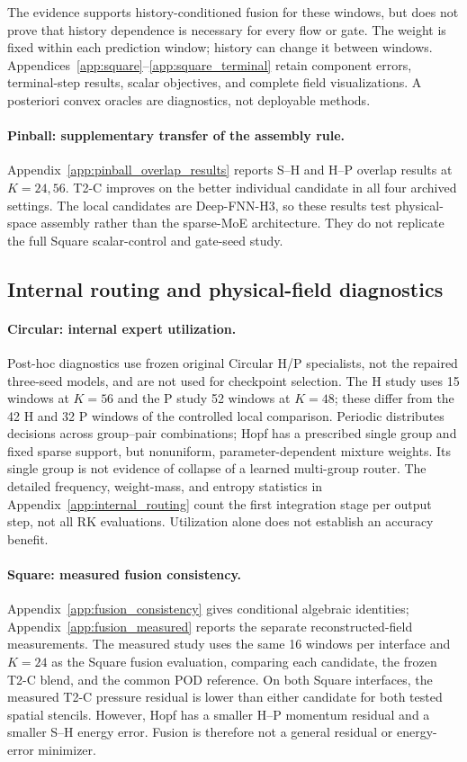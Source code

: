 The evidence supports history-conditioned fusion for these windows,
but does not prove that history dependence is necessary for every
flow or gate. The weight is fixed within each prediction window;
history can change it between windows.
Appendices~\ref{app:square}--\ref{app:square_terminal} retain component errors, terminal-step
results, scalar objectives, and complete field visualizations.
A posteriori convex oracles are diagnostics, not deployable methods.

\paragraph{Pinball: supplementary transfer of the assembly rule.}
Appendix~\ref{app:pinball_overlap_results} reports S--H and H--P
overlap results at $K=24,56$. T2-C improves on the better individual
candidate in all four archived settings. The local candidates are
Deep-FNN-H3, so these results test physical-space assembly rather than
the sparse-MoE architecture. They do not replicate the full Square
scalar-control and gate-seed study.

\subsection{Internal routing and physical-field diagnostics}
\label{sec:exp_diagnostics}

\paragraph{Circular: internal expert utilization.}
Post-hoc diagnostics use frozen original Circular H/P specialists,
not the repaired three-seed models, and are not used for checkpoint
selection. The H study uses 15 windows at $K=56$ and the P study
52 windows at $K=48$; these differ from the 42 H and 32 P windows
of the controlled local comparison.
Periodic distributes decisions across group--pair combinations;
Hopf has a prescribed single group and fixed sparse support, but
nonuniform, parameter-dependent mixture weights.
Its single group is not evidence of collapse of a learned
multi-group router. The detailed frequency, weight-mass, and entropy
statistics in Appendix~\ref{app:internal_routing} count the first
integration stage per output step, not all RK evaluations.
Utilization alone does not establish an accuracy benefit.

\paragraph{Square: measured fusion consistency.}
Appendix~\ref{app:fusion_consistency} gives conditional algebraic
identities; Appendix~\ref{app:fusion_measured} reports the separate
reconstructed-field measurements. The measured
study uses the same 16 windows per interface and $K=24$ as the Square
fusion evaluation, comparing each candidate, the frozen T2-C blend,
and the common POD reference.
On both Square interfaces, the measured T2-C pressure residual is
lower than either candidate for both tested spatial stencils.
However, Hopf has a smaller H--P momentum residual and a smaller
S--H energy error. Fusion is therefore not a general residual or
energy-error minimizer.

